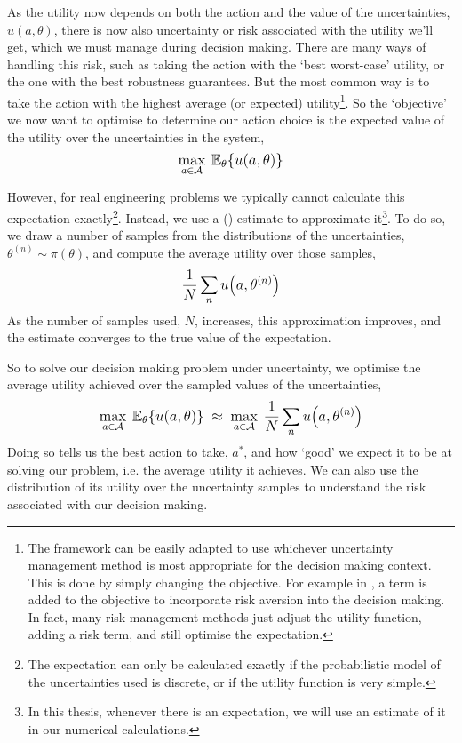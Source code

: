 As the utility now depends on both the action and the value of the uncertainties, $u(a,\theta)$, there is now also uncertainty or risk associated with the utility we'll get, which we must manage during decision making. There are many ways of handling this risk, such as taking the action with the `best worst-case' utility, or the one with the best robustness guarantees. But the most common way is to take the action with the highest average (or expected) utility\footnote{The framework can be easily adapted to use whichever uncertainty management method is most appropriate for the decision making context. This is done by simply changing the objective. For example in , a  term is added to the objective to incorporate risk aversion into the decision making. In fact, many risk management methods just adjust the utility function, adding a risk term, and still optimise the expectation.}. So the `objective' we now want to optimise to determine our action choice is the expected value of the utility over the uncertainties in the system,
\begin{equation} \label{eq:methodology-prior-optimisation}
    \mathlarger{\max_{a \in \mathcal{A}} \: \mathbb{E}_{\theta}\lbrace u(a,\theta) \rbrace}
\end{equation}

\newpage

\noindent
However, for real engineering problems we typically cannot calculate this expectation exactly\footnote{The expectation can only be calculated exactly if the probabilistic model of the uncertainties used is discrete, or if the utility function is very simple.}. Instead, we use a  () estimate to approximate it\footnote{In this thesis, whenever there is an expectation, we will use an  estimate of it in our numerical calculations.}. To do so, we draw a number of samples from the distributions of the uncertainties, $\theta^{(n)} \sim \pi(\theta)$, and compute the average utility over those samples,
\begin{equation}
    \mathlarger{\frac{1}{N} \sum_n u\big(a,\theta^{(n)}\big)}
\end{equation}
As the number of samples used, $N$, increases, this approximation improves, and the estimate converges to the true value of the expectation.

So to solve our decision making problem under uncertainty, we optimise the average utility achieved over the sampled values of the uncertainties,
\begin{equation}
    \mathlarger{\max_{a \in \mathcal{A}} \: \mathbb{E}_{\theta}\lbrace u(a,\theta) \rbrace \: \approx \: \max_{a \in \mathcal{A}} \: \frac{1}{N} \sum_n u\big(a,\theta^{(n)}\big)}
\end{equation}
Doing so tells us the best action to take, $a^*$, and how `good' we expect it to be at solving our problem, i.e. the average utility it achieves. We can also use the distribution of its utility over the uncertainty samples to understand the risk associated with our decision making.\\

